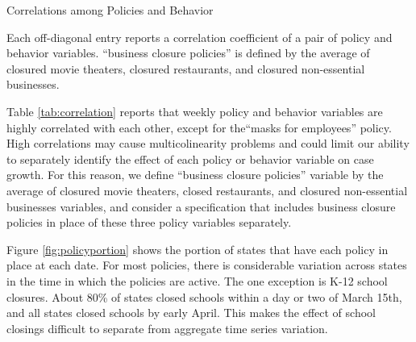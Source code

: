 \documentclass[11pt,reqno,letter]{amsart}
\theoremstyle{definition}
\begin{document}
\begin{table}\caption{Correlations among Policies and Behavior \label{tab:correlation}}\vspace{-0.2cm}
  \begin{minipage}{\linewidth}
    \resizebox{\linewidth}{!}{
      
    }\smallskip
       \begin{flushleft}
         \scriptsize
         Each off-diagonal entry reports a correlation coefficient of
         a pair of policy and behavior variables. ``business closure policies'' is defined by the average of  closured movie theaters, closured restaurants, and closured non-essential businesses.
       \end{flushleft}
  \end{minipage}
\end{table}

Table \ref{tab:correlation} reports that weekly policy and behavior
variables are highly correlated with each other, except for the``masks
for employees'' policy.  High correlations may cause multicolinearity
problems and could limit our ability to separately identify the
effect of each policy or behavior variable on case growth.
For this reason, we define  ``business closure policies'' variable by the average of closured movie theaters, closed  restaurants, and closured non-essential businesses variables, and consider a specification that includes business closure policies   in place of these three policy variables separately.

Figure \ref{fig:policyportion} shows the portion of states that have
each policy in place at each date. For most policies, there is
considerable variation across states in the time in which the policies
are active. The one exception is K-12 school closures. About 80\% of
states closed schools within a day or two of March 15th, and all
states closed schools by early April. This makes the effect of school
closings difficult to separate from aggregate time series variation.
\end{document}
